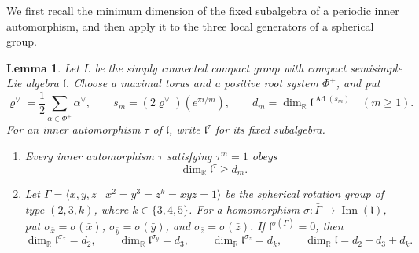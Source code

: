 \documentclass[11pt,a4paper,reqno]{amsart}
\theoremstyle{plain}
\newtheorem{lemma}[theorem]{Lemma}
\theoremstyle{definition}
\theoremstyle{remark}
\numberwithin{equation}{section}
\DeclareMathOperator{\Ad}{Ad}
\newcommand{\RR}{\mathbb R}
\newcommand{\fl}{\mathfrak l}
\newcommand{\rh}{\varrho^\vee}
\begin{document}
We first recall the minimum dimension of the fixed subalgebra of a periodic inner automorphism, and then apply it to the three local generators of a spherical group.

\begin{lemma}\label{lem:minima}
Let $L$ be the simply connected compact group with compact semisimple Lie algebra $\fl$. Choose a maximal torus and a positive root system $\Phi^+$, and put
\[
\rh=\frac12\sum_{\alpha\in\Phi^+}\alpha^\vee,\qquad
s_m=(2\rh)(e^{\pi i/m}),\qquad
d_m=\dim_{\RR}\fl^{\Ad(s_m)}
\quad(m\ge1).
\]
For an inner automorphism $\tau$ of $\fl$, write $\fl^\tau$ for its fixed subalgebra.
\begin{enumerate}[label=\textup{(\arabic*)},leftmargin=2em]
\item Every inner automorphism $\tau$ satisfying $\tau^m=1$ obeys
\[
\dim_{\RR}\fl^\tau\ge d_m.
\]
\item Let $\bar\Gamma=\langle \bar x,\bar y,\bar z\mid \bar x^2=\bar y^3=\bar z^k=\bar x\bar y\bar z=1\rangle$ be the spherical rotation group of type $(2,3,k)$, where $k\in\{3,4,5\}$. For a homomorphism $\sigma\colon\bar\Gamma\to\operatorname{Inn}(\fl)$, put $\sigma_{\bar x}=\sigma(\bar x)$, $\sigma_{\bar y}=\sigma(\bar y)$, and $\sigma_{\bar z}=\sigma(\bar z)$. If $\fl^{\sigma(\bar\Gamma)}=0$, then
\[
\dim_{\RR}\fl^{\sigma_{\bar x}}=d_2,\qquad
\dim_{\RR}\fl^{\sigma_{\bar y}}=d_3,\qquad
\dim_{\RR}\fl^{\sigma_{\bar z}}=d_k,\qquad
\dim_{\RR}\fl=d_2+d_3+d_k.
\]
\end{enumerate}
\end{lemma}
\end{document}
